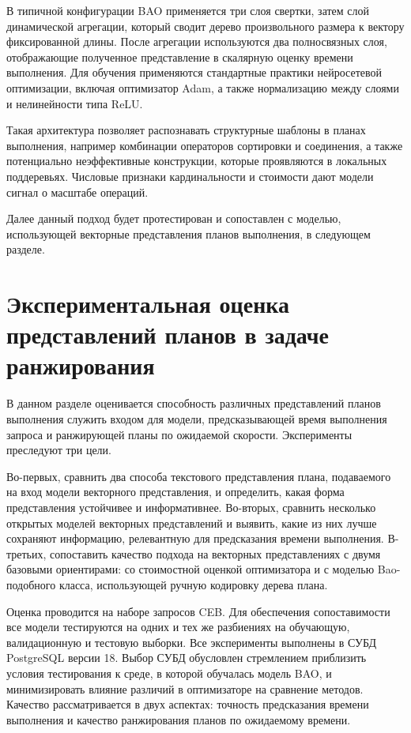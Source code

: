 В типичной конфигурации BAO применяется три слоя свертки, затем слой динамической агрегации, который сводит дерево произвольного размера к вектору фиксированной длины. После агрегации используются два полносвязных слоя, отображающие полученное представление в скалярную оценку времени выполнения. Для обучения применяются стандартные практики нейросетевой оптимизации, включая оптимизатор Adam, а также нормализацию между слоями и нелинейности типа ReLU.

Такая архитектура позволяет распознавать структурные шаблоны в планах выполнения, например комбинации операторов сортировки и соединения, а также потенциально неэффективные конструкции, которые проявляются в локальных поддеревьях. Числовые признаки кардинальности и стоимости дают модели сигнал о масштабе операций.

Далее данный подход будет протестирован и сопоставлен с моделью, использующей векторные представления планов выполнения, в следующем разделе.


\section{Экспериментальная оценка представлений планов в задаче ранжирования}

В данном разделе оценивается способность различных представлений планов выполнения служить входом для модели, предсказывающей время выполнения запроса и ранжирующей планы по ожидаемой скорости. Эксперименты преследуют три цели.

Во-первых, сравнить два способа текстового представления плана, подаваемого на вход модели векторного представления, и определить, какая форма представления устойчивее и информативнее. Во-вторых, сравнить несколько открытых моделей векторных представлений и выявить, какие из них лучше сохраняют информацию, релевантную для предсказания времени выполнения. В-третьих, сопоставить качество подхода на векторных представлениях с двумя базовыми ориентирами: со стоимостной оценкой оптимизатора и с моделью Bao-подобного класса, использующей ручную кодировку дерева плана.

Оценка проводится на наборе запросов CEB. Для обеспечения сопоставимости все модели тестируются на одних и тех же разбиениях на обучающую, валидационную и тестовую выборки. Все эксперименты выполнены в СУБД PostgreSQL версии 18. Выбор СУБД обусловлен стремлением приблизить условия тестирования к среде, в которой обучалась модель BAO, и минимизировать влияние различий в оптимизаторе на сравнение методов. Качество рассматривается в двух аспектах: точность предсказания времени выполнения и качество ранжирования планов по ожидаемому времени.

